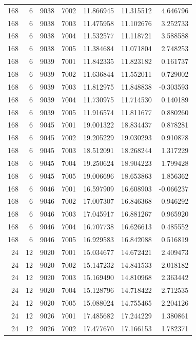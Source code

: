 \begin{table}
\begin{tabular}{rrrrrrr}
168 & 6 & 9038 & 7002 & 11.866945 & 11.315512 & 4.646796 \\
168 & 6 & 9038 & 7003 & 11.475958 & 11.102676 & 3.252733 \\
168 & 6 & 9038 & 7004 & 11.532577 & 11.118721 & 3.588588 \\
168 & 6 & 9038 & 7005 & 11.384684 & 11.071804 & 2.748253 \\
168 & 6 & 9039 & 7001 & 11.842335 & 11.823182 & 0.161737 \\
168 & 6 & 9039 & 7002 & 11.636844 & 11.552011 & 0.729002 \\
168 & 6 & 9039 & 7003 & 11.812975 & 11.848838 & -0.303593 \\
168 & 6 & 9039 & 7004 & 11.730975 & 11.714530 & 0.140189 \\
168 & 6 & 9039 & 7005 & 11.916574 & 11.811677 & 0.880260 \\
168 & 6 & 9045 & 7001 & 19.001322 & 18.834437 & 0.878281 \\
168 & 6 & 9045 & 7002 & 19.205229 & 19.030293 & 0.910878 \\
168 & 6 & 9045 & 7003 & 18.512091 & 18.268244 & 1.317229 \\
168 & 6 & 9045 & 7004 & 19.250624 & 18.904223 & 1.799428 \\
168 & 6 & 9045 & 7005 & 19.006696 & 18.653863 & 1.856362 \\
168 & 6 & 9046 & 7001 & 16.597909 & 16.608903 & -0.066237 \\
168 & 6 & 9046 & 7002 & 17.007307 & 16.846368 & 0.946292 \\
168 & 6 & 9046 & 7003 & 17.045917 & 16.881267 & 0.965920 \\
168 & 6 & 9046 & 7004 & 16.707738 & 16.626613 & 0.485552 \\
168 & 6 & 9046 & 7005 & 16.929583 & 16.842088 & 0.516819 \\
24 & 12 & 9020 & 7001 & 15.034677 & 14.672421 & 2.409473 \\
24 & 12 & 9020 & 7002 & 15.147232 & 14.841533 & 2.018182 \\
24 & 12 & 9020 & 7003 & 15.169490 & 14.810968 & 2.363442 \\
24 & 12 & 9020 & 7004 & 15.128796 & 14.718422 & 2.712535 \\
24 & 12 & 9020 & 7005 & 15.088024 & 14.755465 & 2.204126 \\
24 & 12 & 9026 & 7001 & 17.485682 & 17.244229 & 1.380861 \\
24 & 12 & 9026 & 7002 & 17.477670 & 17.166153 & 1.782371 \\

\end{tabular}
\end{table}
